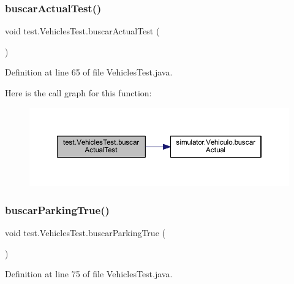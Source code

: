 \subsubsection{\texorpdfstring{buscar\+Actual\+Test()}{buscarActualTest()}}
{\footnotesize\ttfamily void test.\+Vehicles\+Test.\+buscar\+Actual\+Test (\begin{DoxyParamCaption}{ }\end{DoxyParamCaption})}



Definition at line 65 of file Vehicles\+Test.\+java.

Here is the call graph for this function\+:\nopagebreak
\begin{figure}[H]
\begin{center}
\leavevmode
\includegraphics[width=350pt]{classtest_1_1_vehicles_test_a946e0396eb3a4547d8f588408bc82a6d_cgraph}
\end{center}
\end{figure}
\mbox{\label{classtest_1_1_vehicles_test_af769f7022f74eff2bbb9a77f5aea83f8}} 
\subsubsection{\texorpdfstring{buscar\+Parking\+True()}{buscarParkingTrue()}}
{\footnotesize\ttfamily void test.\+Vehicles\+Test.\+buscar\+Parking\+True (\begin{DoxyParamCaption}{ }\end{DoxyParamCaption})}



Definition at line 75 of file Vehicles\+Test.\+java.

